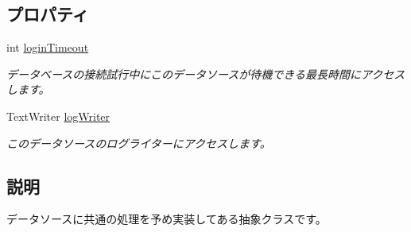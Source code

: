 \subsection*{プロパティ}
\begin{DoxyCompactItemize}
\item 
int \hyperlink{classlazurite_1_1relation_1_1common_1_1_abstract_data_source_a95357e4aa2578c81c55805ef877f6694}{loginTimeout}
\begin{DoxyCompactList}\small\item\em データベースの接続試行中にこのデータソースが待機できる最長時間にアクセスします。 \item\end{DoxyCompactList}\item 
TextWriter \hyperlink{classlazurite_1_1relation_1_1common_1_1_abstract_data_source_ac0df2dbaf0813abab29a34aad40a7e12}{logWriter}
\begin{DoxyCompactList}\small\item\em このデータソースのログライターにアクセスします。 \item\end{DoxyCompactList}\end{DoxyCompactItemize}


\subsection{説明}
データソースに共通の処理を予め実装してある抽象クラスです。 

